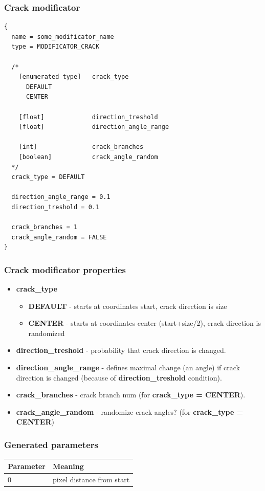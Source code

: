 \documentclass[9pt]{article}
\begin{document}
\newpage
\subsubsection{Crack modificator}

\begin{verbatim}
{
  name = some_modificator_name
  type = MODIFICATOR_CRACK

  /*
    [enumerated type]   crack_type    
      DEFAULT
      CENTER
      
    [float]             direction_treshold
    [float]             direction_angle_range
    
    [int]               crack_branches
    [boolean]           crack_angle_random
  */
  crack_type = DEFAULT
  
  direction_angle_range = 0.1
  direction_treshold = 0.1
  
  crack_branches = 1
  crack_angle_random = FALSE
}
\end{verbatim}
\subsubsection*{Crack modificator properties}
\begin{itemize}
\item{\bf crack\_type}
\begin{itemize}
\item{\bf DEFAULT} - starts at coordinates start, crack direction is size
\item{\bf CENTER} - starts at coordinates center (start+size/2), 
crack direction is randomized
\end{itemize}
\item{\bf direction\_treshold} - probability that crack direction is changed.
\item{\bf direction\_angle\_range} - defines maximal change (an angle)
if crack direction is changed (because of {\bf direction\_treshold} condition).
\item{\bf crack\_branches} - crack branch num (for {\bf crack\_type = CENTER}).
\item{\bf crack\_angle\_random} - randomize crack angles? (for {\bf crack\_type = CENTER})
\end{itemize}

\subsubsection*{Generated parameters}

\begin{center}
\begin{tabular}{|l||l|}
\hline
  Parameter & Meaning \\
\hline  
\hline  
  0 & pixel distance from start \\
\hline
\end{tabular}
\end{center}
\end{document}
